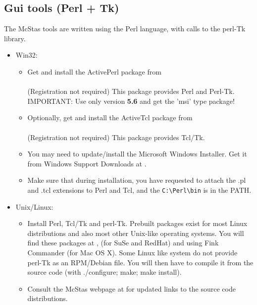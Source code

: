\subsection{Gui tools (Perl + Tk)}
\label{s:perltk}

The McStas tools are written using the Perl language, with calls to the perl-Tk library.

\begin{itemize}
\item{Win32:}
  \begin{itemize}
  \item{Get and install the ActivePerl package from\\
      \\(Registration
      not required)  This package provides Perl and
      Perl-Tk. IMPORTANT: Use only version {\bf 5.6} and get the 'msi' type package!}
  \item{Optionally, get and install the ActiveTcl package from\\
      \\(Registration
      not required) This package provides Tcl/Tk.}
  \item{You may need to update/install the Microsoft Windows Installer. Get it from Windows Support Downloads at .}
  \item{Make sure that during installation, you have requested to attach the .pl and .tcl extensions to Perl and Tcl, and the \verb+C:\Perl\bin+ is in the PATH.}
  \end{itemize}
\item{Unix/Linux:}
  \begin{itemize}
    \item{Install Perl, Tcl/Tk and perl-Tk. Prebuilt packages exist for
      most Linux distributions and also most other Unix-like operating
      systems. You will find these packages at ,  (for SuSe and RedHat) and using Fink Commander (for Mac OS X). Some Linux like system do not provide perl-Tk as an RPM/Debian file. You will then have to compile it from the source code (with ./configure; make; make install).}
    \item{Consult the McStas webpage at  for updated links to the source code distributions.}
    \end{itemize}
  \end{itemize}

